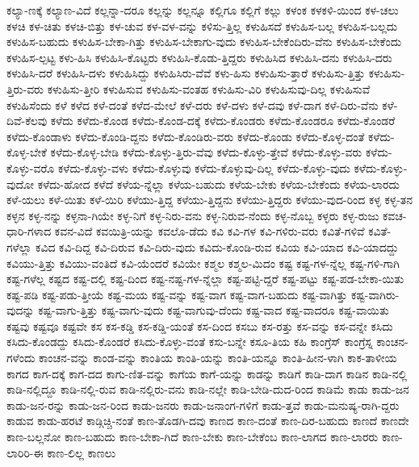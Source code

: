 {ಕಲ್ಯಾ-ಣಕ್ಕೆ
ಕಲ್ಯಾಣ-ವಿದೆ
ಕಲ್ಲನ್ನಾ-ದರೂ
ಕಲ್ಲನ್ನು
ಕಲ್ಲನ್ನೂ
ಕಲ್ಲಿಗೂ
ಕಲ್ಲಿಗೆ
ಕಲ್ಲು
ಕಳಂಕ
ಕಳಕಳಿ-ಯಿಂದ
ಕಳ-ಚಲು
ಕಳಚಿ
ಕಳ-ಚಿತು
ಕಳಚಿ-ಬಿತ್ತು
ಕಳ-ಚುವ
ಕಳ-ವಳ-ವನ್ನು
ಕಳಿಸು-ತ್ತಿಲ್ಲ
ಕಳುಹಿಸದೆ
ಕಳುಹಿಸ-ಬಲ್ಲ
ಕಳುಹಿಸ-ಬಲ್ಲದು
ಕಳುಹಿಸ-ಬಹುದು
ಕಳುಹಿಸ-ಬೇಕಾ-ಗಿತ್ತು
ಕಳುಹಿಸ-ಬೇಕಾಗು-ವುದು
ಕಳುಹಿಸ-ಬೇಕೆಂದಿರು-ವೆನು
ಕಳುಹಿಸ-ಬೇಕೆಂದು
ಕಳುಹಿಸ-ಲ್ಪಟ್ಟ
ಕಳು-ಹಿಸಿ
ಕಳುಹಿಸಿ-ಕೊಟ್ಟರು
ಕಳುಹಿಸಿ-ಕೊಡು-ತ್ತಿದ್ದರು
ಕಳುಹಿಸಿದ
ಕಳುಹಿಸಿ-ದನು
ಕಳುಹಿಸಿ-ದರು
ಕಳುಹಿಸಿ-ದರೆ
ಕಳುಹಿಸಿ-ದಳು
ಕಳುಹಿಸಿದ್ದು
ಕಳುಹಿಸಿರು-ವೆವೆ
ಕಳು-ಹಿಸು
ಕಳುಹಿಸು-ತ್ತಾರೆ
ಕಳುಹಿಸು-ತ್ತಿತ್ತು
ಕಳುಹಿಸು-ತ್ತಿರು-ವರು
ಕಳುಹಿಸು-ತ್ತೀರಿ
ಕಳುಹಿಸುವ
ಕಳುಹಿಸು-ವಂತಹ
ಕಳುಹಿಸು-ವಿರಿ
ಕಳುಹಿಸುವು-ದಿಲ್ಲ
ಕಳುಹಿಸುವೆ
ಕಳುಹಿಸೆಂದು
ಕಳೆ
ಕಳೆದ
ಕಳೆ-ದಂತೆ
ಕಳೆದ-ಮೇಲೆ
ಕಳೆ-ದರು
ಕಳೆ-ದಳು
ಕಳೆ-ದವು
ಕಳೆ-ದಾಗ
ಕಳೆ-ದಿರು-ವೆನು
ಕಳೆ-ದಿವೆ-ಕೆಲವು
ಕಳೆದು
ಕಳೆದು-ಕೊಂಡ
ಕಳೆದು-ಕೊಂಡ-ದಕ್ಕೆ
ಕಳೆದು-ಕೊಂಡರು
ಕಳೆದು-ಕೊಂಡರೂ
ಕಳೆದು-ಕೊಂಡರೆ
ಕಳೆದು-ಕೊಂಡಾಳು
ಕಳೆದು-ಕೊಂಡಿ-ದ್ದನು
ಕಳೆದು-ಕೊಂಡಿರು-ವರು
ಕಳೆದು-ಕೊಂಡು
ಕಳೆದು-ಕೊಳ್ಳ-ದಂತೆ
ಕಳೆದು-ಕೊಳ್ಳ-ಬೇಕೆ
ಕಳೆದು-ಕೊಳ್ಳ-ಬೇಡಿ
ಕಳೆದು-ಕೊಳ್ಳು-ತ್ತಿರು-ವೆವು
ಕಳೆದು-ಕೊಳ್ಳು-ತ್ತೇವೆ
ಕಳೆದು-ಕೊಳ್ಳು-ವರು
ಕಳೆದು-ಕೊಳ್ಳು-ವರೊ
ಕಳೆದು-ಕೊಳ್ಳು-ವಳು
ಕಳೆದು-ಕೊಳ್ಳುವು
ಕಳೆದು-ಕೊಳ್ಳುವು-ದಿಲ್ಲ
ಕಳೆದು-ಕೊಳ್ಳು-ವುದು
ಕಳೆದು-ಕೊಳ್ಳು-ವುದೋ
ಕಳೆದು-ಹೋದ
ಕಳೆದೆ
ಕಳೆಯ-ನ್ನೆಲ್ಲಾ
ಕಳೆಯ-ಬಹುದು
ಕಳೆಯ-ಬೇಕು
ಕಳೆಯ-ಬೇಕೆಂದು
ಕಳೆಯ-ಲಾರದು
ಕಳೆ-ಯಲು
ಕಳೆ-ಯಿತು
ಕಳೆ-ಯಿರಿ
ಕಳೆಯು-ತ್ತಿದ್ದ
ಕಳೆಯು-ತ್ತಿದ್ದನು
ಕಳೆಯು-ತ್ತಿದ್ದರು
ಕಳೆಯು-ವುದ-ರಿಂದ
ಕಳ್ಳ
ಕಳ್ಳ-ತನ
ಕಳ್ಳನ
ಕಳ್ಳ-ನನ್ನು
ಕಳ್ಳನಾ-ಗಿಯೇ
ಕಳ್ಳ-ನಿಗೆ
ಕಳ್ಳ-ನಿರು-ವನು
ಕಳ್ಳ-ನಿರುವ-ನೆಂದು
ಕಳ್ಳ-ನೊಬ್ಬ
ಕಳ್ಳರು
ಕಳ್ಳ-ರುಜು
ಕವಚ-ಧಾರಿ-ಗಳಾದ
ಕವನ-ವಿದೆ
ಕವಯಿತ್ರಿ-ಯನ್ನು
ಕವಲೊ-ಡೆದು
ಕವಿ
ಕವಿ-ಗಳ
ಕವಿ-ಗಳಿರು-ವರು
ಕವಿತೆ-ಗಳಿವೆ
ಕವಿತೆ-ಗಳೆಲ್ಲಾ
ಕವಿದ
ಕವಿ-ದಿದ್ದ
ಕವಿ-ದಿರುವ
ಕವಿ-ದಿರು-ವುದು
ಕವಿದು-ಕೊಂಡಿ-ರುವ
ಕವಿಯ
ಕವಿ-ಯಾದ
ಕವಿ-ಯಾದದ್ದು
ಕವಿಯು-ತ್ತಿತ್ತು
ಕವಿಯು-ವಂತಿದೆ
ಕವಿ-ಯೆಂದರೆ
ಕವಿಯೇ
ಕಶ್ಮಲ
ಕಶ್ಮಲ-ಮಿದಂ
ಕಷ್ಟ
ಕಷ್ಟ-ಗಳ-ನ್ನೆಲ್ಲ
ಕಷ್ಟ-ಗಳಿ-ಗಾಗಿ
ಕಷ್ಟ-ಗಳೆಲ್ಲ
ಕಷ್ಟದ
ಕಷ್ಟ-ದಲ್ಲಿ
ಕಷ್ಟ-ದಿಂದ
ಕಷ್ಟ-ನಷ್ಟ-ಗಳ-ನ್ನೆಲ್ಲಾ
ಕಷ್ಟ-ಪಟ್ಟಿ-ದ್ದರೆ
ಕಷ್ಟ-ಪಟ್ಟು
ಕಷ್ಟ-ಪಡ-ಬೇಕಾ-ಯಿತು
ಕಷ್ಟ-ಪಡಿ
ಕಷ್ಟ-ಪಡು-ತ್ತೀಯೆ
ಕಷ್ಟ-ಮಯ
ಕಷ್ಟ-ವನ್ನು
ಕಷ್ಟ-ವಾಗ
ಕಷ್ಟ-ವಾಗ-ಬಹುದು
ಕಷ್ಟ-ವಾಗಿತ್ತು
ಕಷ್ಟ-ವಾಗಿರು-ವುದನ್ನು
ಕಷ್ಟ-ವಾಗು-ತ್ತಿತ್ತು
ಕಷ್ಟ-ವಾಗು-ವುದು
ಕಷ್ಟ-ವಾಗುವು-ದೆಂದು
ಕಷ್ಟ-ವಾದ
ಕಷ್ಟ-ವಾದರೂ
ಕಷ್ಟ-ವಾಯಿತು
ಕಷ್ಟವು
ಕಷ್ಟವೂ
ಕಷ್ಟವೇ
ಕಸ
ಕಸ-ಕಡ್ಡಿ
ಕಸ-ಕಡ್ಡಿ-ಯಂತೆ
ಕಸ-ದಿಂದ
ಕಸಬು
ಕಸ-ರತ್ತು
ಕಸ-ವನ್ನು
ಕಸ-ವನ್ನೇ
ಕಸಿದು
ಕಸಿದು-ಕೊಂಡದ್ದು
ಕಸಿದು-ಕೊಂಡರೆ
ಕಸಿದು-ಕೊಳ್ಳು-ವಂತೆ
ಕಸು-ಬನ್ನೇ
ಕಸೂ-ತಿಯ
ಕಹಿ
ಕಾಂಗ್ರೆಸ್
ಕಾಂಗ್ರೆಸ್ನ
ಕಾಂಚನ-ಗಳೆಂದು
ಕಾಂಚನ-ವನ್ನು
ಕಾಂಡ-ವನ್ನು
ಕಾಂತಿಯ
ಕಾಂತಿ-ಯನ್ನು
ಕಾಂತಿ-ಯನ್ನೂ
ಕಾಂತಿ-ಹೀನ-ಳಾಗಿ
ಕಾಕ-ತಾಳೀಯ
ಕಾಗದ
ಕಾಗ-ದಕ್ಕೆ
ಕಾಗ-ದದ
ಕಾಗು-ಣಿತ-ವನ್ನು
ಕಾಗೆಯ
ಕಾಗೆ-ಯನ್ನು
ಕಾಡನ್ನು
ಕಾಡಿಗೆ
ಕಾಡಿ-ದಾಗ
ಕಾಡಿನ
ಕಾಡಿ-ನಲ್ಲಿ
ಕಾಡಿ-ನಲ್ಲಿದ್ದೂ
ಕಾಡಿ-ನಲ್ಲಿ-ರುವ
ಕಾಡಿ-ನಲ್ಲಿರು-ವನು
ಕಾಡಿ-ನಲ್ಲೇ
ಕಾಡಿ-ಬೇಡಿ-ದುದ-ರಿಂದ
ಕಾಡಿಮೆ
ಕಾಡು
ಕಾಡು-ಜನ
ಕಾಡು-ಜನ-ರನ್ನು
ಕಾಡು-ಜನ-ರಿಂದ
ಕಾಡು-ಜನರು
ಕಾಡು-ಜನಾಂಗ-ಗಳಿಗೆ
ಕಾಡು-ತ್ತವೆ
ಕಾಡು-ಮನುಷ್ಯ-ರಾಗಿ-ದ್ದರು
ಕಾಡುವ
ಕಾಡು-ಹರಟೆ
ಕಾಡ್ಗಿಚ್ಚಿ-ನಂತೆ
ಕಾಣ-ತೊಡಗಿ-ದವು
ಕಾಣದ
ಕಾಣ-ದಂತೆ
ಕಾಣ-ದಿರ-ಬಹುದು
ಕಾಣದೆ
ಕಾಣದೇ
ಕಾಣ-ಬಲ್ಲನೋ
ಕಾಣ-ಬಹುದು
ಕಾಣ-ಬೇಕಾ-ಗಿದೆ
ಕಾಣ-ಬೇಕು
ಕಾಣ-ಬೇಕೆಂಬ
ಕಾಣ-ಲಾಗದ
ಕಾಣ-ಲಾರರು
ಕಾಣ-ಲಾರಿರಿ-ಈ
ಕಾಣ-ಲಿಲ್ಲ
ಕಾಣಲು
}
